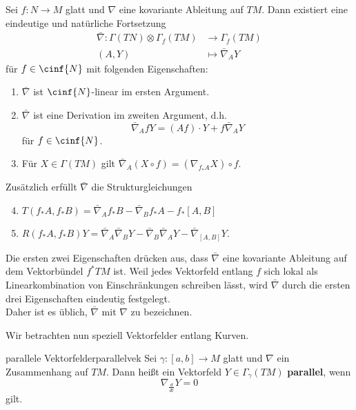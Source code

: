 \begin{satz}{}{}
Sei $f: N \to M$ glatt und $\nabla$ eine kovariante Ableitung auf $TM$. Dann existiert eine eindeutige und natürliche Fortsetzung
\begin{align}
\bar{\nabla}: \Gamma(TN) \otimes \Gamma_f(TM) &\to \Gamma_f(TM)\\
(A, Y) &\mapsto \bar{\nabla}_A Y
\end{align}
für $f \in \cinf{N}$ mit folgenden Eigenschaften:
\begin{enumerate}
\item $\bar{\nabla}$ ist $\cinf{N}$-linear im ersten Argument.
\item $\bar{\nabla}$ ist eine Derivation im zweiten Argument, d.h.
\begin{equation}
\bar{\nabla}_A fY = (Af) \cdot Y + f \bar{\nabla}_A Y
\end{equation}
für $f \in \cinf{N}$.
\item Für $X \in \Gamma(TM)$ gilt $\bar{\nabla}_A (X \circ f) = \left( \nabla_{f_\ast A} X\right) \circ f$.
\end{enumerate}
Zusätzlich erfüllt $\bar{\nabla}$ die Strukturgleichungen
\begin{enumerate}
\setcounter{enumi}{3}
\item $T(f_\ast A, f_\ast B) = \bar{\nabla}_A f_\ast B - \bar{\nabla}_B f_\ast A - f_\ast [A, B]$
\item $R(f_\ast A, f_\ast B)Y = \bar{\nabla}_A \bar{\nabla}_B Y - \bar{\nabla}_B \bar{\nabla}_A Y - \bar{\nabla}_{[A,B]} Y$.
\end{enumerate}
\end{satz}
\begin{bemerkung}
Die ersten zwei Eigenschaften drücken aus, dass $\bar{\nabla}$ eine kovariante Ableitung auf dem Vektorbündel $f^\ast TM$ ist. Weil jedes Vektorfeld entlang $f$ sich lokal als Linearkombination von Einschränkungen schreiben lässt, wird $\bar{\nabla}$ durch die ersten drei Eigenschaften eindeutig festgelegt.\\
Daher ist es üblich, $\bar{\nabla}$ mit $\nabla$ zu bezeichnen.
\end{bemerkung}
Wir betrachten nun speziell Vektorfelder entlang Kurven.
\begin{definition}{parallele Vektorfelder}{parallelvek}
Sei $\gamma: [a,b] \to M$ glatt und $\nabla$ ein Zusammenhang auf $TM$. Dann heißt ein Vektorfeld $Y \in \Gamma_\gamma (TM)$ \textbf{parallel}, wenn
\begin{equation}
\nabla_{\frac{d}{dt}} Y = 0
\end{equation}
gilt.
\end{definition}
